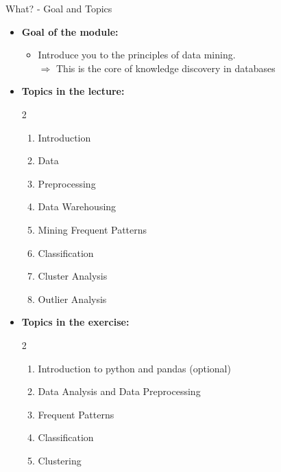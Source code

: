 \begin{frame}{What? - Goal and Topics}
	\begin{itemize}
		\item \textbf{Goal of the module:}
		      \begin{itemize}
			      \item Introduce you to the principles of data mining. \\
			            $\Rightarrow$ This is the core of knowledge discovery in databases
		      \end{itemize}
		\item \textbf{Topics in the lecture:}
		      \vspace*{-1\multicolsep}
		      \begin{multicols}{2}
			      \begin{enumerate}
				      \item Introduction
				      \item Data
				      \item Preprocessing
				      \item Data Warehousing
				      \item Mining Frequent Patterns
				      \item Classification
				      \item Cluster Analysis
				      \item Outlier Analysis
			      \end{enumerate}
		      \end{multicols}
		      \vspace*{-0.75\multicolsep}
		\item \textbf{Topics in the exercise:}
		      \vspace*{-1\multicolsep}
		      \begin{multicols}{2}
			      \begin{enumerate}
				      \item Introduction to python and pandas {\color{gray}(optional)}
				      \item Data Analysis and Data Preprocessing
				      \item Frequent Patterns
				      \item Classification
				      \item Clustering
			      \end{enumerate}

\end{multicols}
\end{itemize}
\end{frame}
